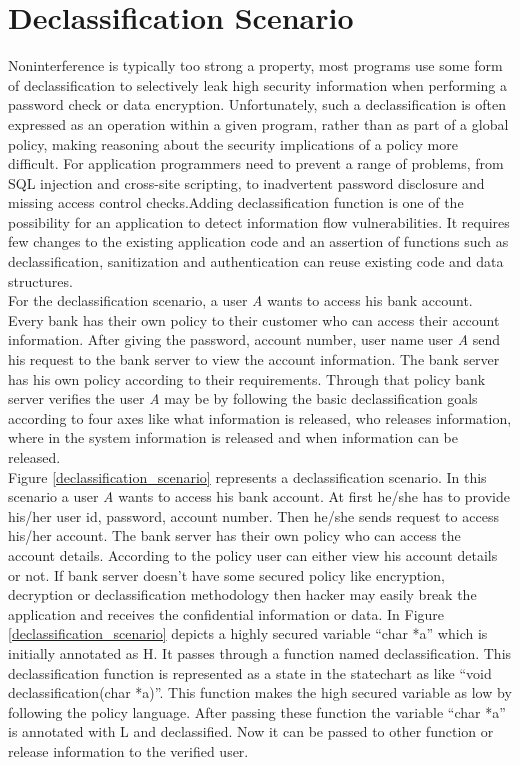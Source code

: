 \section{Declassification Scenario}
 Noninterference is typically
 too strong a property, most programs use some form of declassification to selectively leak high security information when performing a password check or data encryption. Unfortunately, such  a declassification is often expressed as an operation within a given  program, rather than as part of a global policy, making reasoning about the security implications of a policy more difficult. For application programmers need to prevent a range
 of problems, from SQL injection and cross-site scripting, to inadvertent password disclosure and missing access control checks.Adding declassification function is one of the possibility for an application to detect information flow vulnerabilities. It requires few changes to the existing application code and an assertion of functions such as declassification, sanitization and authentication can reuse existing code and data structures. \\
 
 For the declassification scenario, a user \emph{A} wants to access his bank account. Every bank has their own policy to their customer who can access their account information. After giving the password, account number, user name user \emph{A} send his request to the bank server to view the account information. The bank server has his own policy according to their requirements. Through that policy bank server verifies the user \emph{A} may be by following the basic declassification goals according to four axes like what information is released,
 who releases information, where in the system information is released and when information can be released.  \\
 
 Figure \ref{declassification_scenario}  represents a declassification scenario. In this scenario a user \emph{A} wants to access his bank account. At first he/she has to provide his/her user id, password, account number. Then he/she sends request to access his/her account. The bank server has their own policy who can access the account details. According to the policy user can either view his account details or not. If bank server doesn't have some secured policy like encryption, decryption or declassification methodology then hacker may easily break the application and receives the confidential information or data. In Figure \ref{declassification_scenario} depicts a highly secured variable \enquote{char *a} which is initially annotated as H. It passes through a function named declassification. This declassification function is represented as a state in the statechart as like \enquote{void declassification(char *a)}. This function makes the high secured variable as low by following the policy language. After passing these function the variable \enquote{char *a} is annotated with L and declassified. Now it can be passed to other function or release information to the verified user.\\
 
